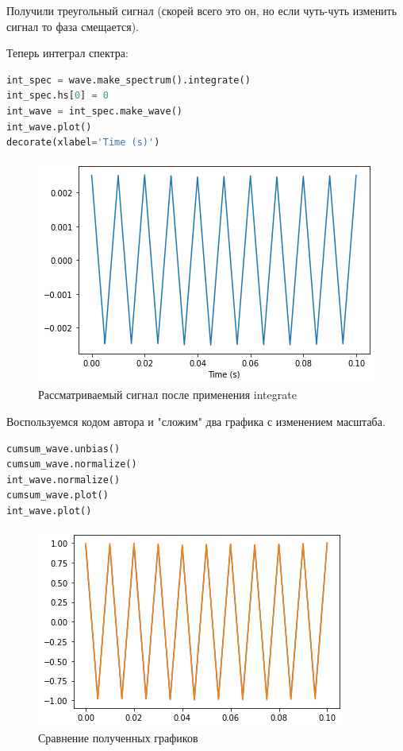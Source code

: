 Получили треугольный сигнал (скорей всего это он, но если чуть-чуть изменить сигнал то фаза смещается).

Теперь интеграл спектра:

\begin{lstlisting}[language=Python]
int_spec = wave.make_spectrum().integrate()
int_spec.hs[0] = 0
int_wave = int_spec.make_wave()
int_wave.plot()
decorate(xlabel='Time (s)')
\end{lstlisting}
\begin{figure}[H]
	\begin{center}
		\includegraphics[scale=1]{fig/lab09/lab09_16_0.png}
		\caption{Рассматриваемый сигнал после применения integrate}
	\end{center}
\end{figure}

Воспользуемся кодом автора и "сложим" два графика с изменением масштаба.

\begin{lstlisting}[language=Python]
cumsum_wave.unbias()
cumsum_wave.normalize()
int_wave.normalize()
cumsum_wave.plot()
int_wave.plot()
\end{lstlisting}
\begin{figure}[H]
	\begin{center}
		\includegraphics[scale=1]{fig/lab09/lab09_18_0.png}
		\caption{Сравнение полученных графиков}
	\end{center}
\end{figure}

